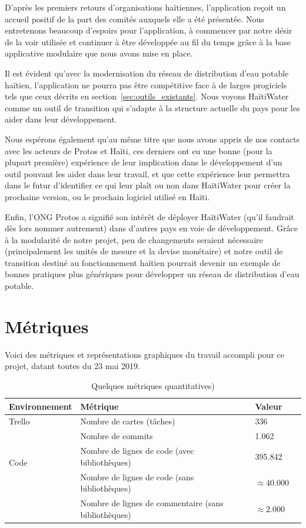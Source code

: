 \documentclass{EPL-master-thesis-covers-FR}
\begin{document}
		D'après les premiers retours d'organisations haïtiennes, l'application reçoit un accueil positif de la part des comités auxquels elle a été présentée. Nous entretenons beaucoup d'espoirs pour l'application, à commencer par notre désir de la voir utilisée et continuer à être développée au fil du temps grâce à la base applicative modulaire que nous avons mise en place.

		Il est évident qu'avec la modernisation du réseau de distribution d'eau potable haïtien, l'application ne pourra pas être compétitive face à de larges progiciels tels que ceux décrits en section~\ref{sec:outils_existants}. Nous voyons HaïtiWater comme un outil de transition qui s'adapte à la structure actuelle du pays pour les aider dans leur développement.

		Nous espérons également qu'au même titre que nous avons appris de nos contacts avec les acteurs de Protos et Haïti, ces derniers ont eu une bonne (pour la plupart première) expérience de leur implication dans le développement d'un outil pouvant les aider dans leur travail, et que cette expérience leur permettra dans le futur d'identifier ce qui leur plaît ou non dans HaïtiWater pour créer la prochaine version, ou le prochain logiciel utilisé en Haïti.

		Enfin, l'ONG Protos a signifié son intérêt de déployer HaïtiWater (qu'il faudrait dès lors nommer autrement) dans d'autres pays en voie de développement. Grâce à la modularité de notre projet, peu de changements seraient nécessaire (principalement les unités de mesure et la devise monétaire) et notre outil de transition destiné au fonctionnement haïtien pourrait devenir un exemple de bonnes pratiques plus génériques pour développer un réseau de distribution d'eau potable.

		\section{Métriques}
			Voici des métriques et représentations graphiques du travail accompli pour ce projet, datant toutes du 23 mai 2019.
			\begin{table}[H]
				\centering
				\begin{tabular}{@{}lllr@{}}
					\toprule
					Environnement	& Métrique	& Valeur \\
					\midrule
					\multirow{1}{*}{Trello} & Nombre de cartes (tâches)  & 336  \\
					\bottomrule
					\multirow{3}{*}{Code} & Nombre de commits & 1.062 \\
						& Nombre de lignes de code (avec bibliothèques) & 395.842\\
						& Nombre de lignes de code (sans bibliothèques) & $\approx 40.000$\\
						& Nombre de lignes de commentaire (sans bibliothèques) & $\approx 2.000$\\
					\bottomrule
				\end{tabular}
				\caption{Quelques métriques quantitatives)}
				\label{tab:table_metriques}
			\end{table}
\end{document}
